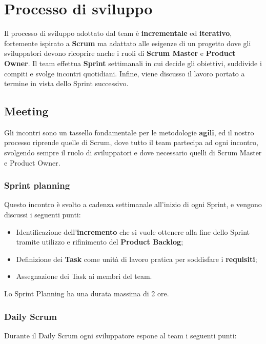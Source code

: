 \section{Processo di sviluppo}


Il processo di sviluppo adottato dal team è \textbf{incrementale} ed \textbf{iterativo}, fortemente ispirato a \textbf{Scrum} ma adattato alle esigenze di un progetto dove gli sviluppatori devono ricoprire anche i ruoli di \textbf{Scrum Master} e \textbf{Product Owner}.
%
Il team effettua \textbf{Sprint} settimanali in cui decide gli obiettivi, suddivide i compiti e svolge incontri quotidiani.
%
Infine, viene discusso il lavoro portato a termine in vista dello Sprint successivo.

\subsection{Meeting}
Gli incontri sono un tassello fondamentale per le metodologie \textbf{agili}, ed il nostro processo riprende quelle di Scrum, dove tutto il team partecipa ad ogni incontro, svolgendo sempre il ruolo di sviluppatori e dove necessario quelli di Scrum Master e Product Owner.

\subsubsection{Sprint planning}
Questo incontro è svolto a cadenza settimanale all'inizio di ogni Sprint, e vengono discussi i seguenti punti:

\begin{itemize}
    \item Identificazione dell'\textbf{incremento} che si vuole ottenere alla fine dello Sprint tramite utilizzo e rifinimento del \textbf{Product Backlog};
    \item Definizione dei \textbf{Task} come unità di lavoro pratica per soddisfare i \textbf{requisiti};
    \item Assegnazione dei Task ai membri del team.
\end{itemize}
Lo Sprint Planning ha una durata massima di 2 ore.

\subsubsection{Daily Scrum}
Durante il Daily Scrum ogni sviluppatore espone al team i seguenti punti:

